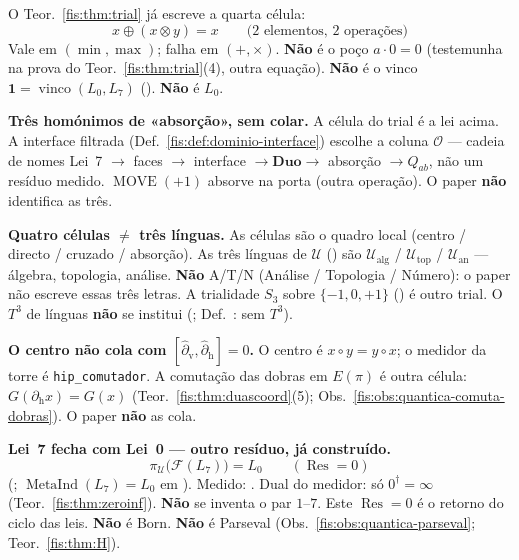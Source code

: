 \documentclass[livro.tex]{subfiles}
\begin{document}
\begin{observacao}\label{fis:obs:quantica-absorcao-lei7}
O Teor.~\ref{fis:thm:trial} já escreve a quarta célula:
\[
\boxed{\;
x\oplus(x\otimes y)=x
\qquad
\text{(2 elementos, 2 operações)}
\;}
\]
Vale em \((\min,\max)\); falha em \((+,\times)\).
\textbf{Não} é o poço \(a\cdot 0=0\)
(testemunha na prova do Teor.~\ref{fis:thm:trial}(4),
outra equação).
\textbf{Não} é o vinco
\(\mathbf{1}=\operatorname{vinco}(L_0,L_7)\)
().
\textbf{Não} é \(L_0\).

\medskip\noindent\textbf{Três homónimos de «absorção», sem colar.}
A célula do trial é a lei acima.
A interface filtrada
(Def.~\ref{fis:def:dominio-interface})
escolhe a coluna \(\mathcal{O}\) ---
cadeia de nomes
Lei~7 \(\to\) faces \(\to\) interface
\(\to\mathbf{Duo}\to\) absorção \(\to Q_{ab}\),
não um resíduo medido.
\(\operatorname{MOVE}(+1)\) absorve na porta
(outra operação).
O paper \textbf{não} identifica as três.

\medskip\noindent\textbf{Quatro células \(\neq\) três línguas.}
As células são o quadro local
(centro / directo / cruzado / absorção).
As três línguas de \(\mathcal{U}\)
()
são
\(\mathcal{U}_{\mathrm{alg}}\) /
\(\mathcal{U}_{\mathrm{top}}\) /
\(\mathcal{U}_{\mathrm{an}}\)
--- álgebra, topologia, análise.
\textbf{Não} A/T/N
(Análise / Topologia / Número):
o paper não escreve essas três letras.
A trialidade \(S_{3}\) sobre
\(\{-1,0,+1\}\)
()
é outro trial.
O \(T^{3}\) de línguas
\textbf{não} se institui
(;
Def.~:
sem \(T^{3}\)).

\medskip\noindent\textbf{O centro não cola com
\([\hat\partial_{\mathrm{v}},\hat\partial_{\mathrm{h}}]=0\).}
O centro é
\(x\circ y=y\circ x\);
o medidor da torre é
\texttt{hip\_comutador}.
A comutação das dobras em \(E(\pi)\)
é outra célula:
\(G(\partial_{\mathrm{h}}x)=G(x)\)
(Teor.~\ref{fis:thm:duascoord}(5);
Obs.~\ref{fis:obs:quantica-comuta-dobras}).
O paper \textbf{não} as cola.

\medskip\noindent\textbf{Lei~7 fecha com Lei~0 --- outro
resíduo, já construído.}
\[
\boxed{\;
\pi_{\mathcal{U}}\bigl(\mathcal{F}(L_7)\bigr)=L_0
\qquad
(\operatorname{Res}=0)
\;}
\]
(;
\(\operatorname{MetaInd}(L_7)=L_0\)
em ).
Medido:
.
Dual do medidor: só
\(0^{\dagger}=\infty\)
(Teor.~\ref{fis:thm:zeroinf}).
\textbf{Não} se inventa o par \(1\)--\(7\).
Este \(\operatorname{Res}=0\) é o retorno
do ciclo das leis.
\textbf{Não} é Born.
\textbf{Não} é Parseval
(Obs.~\ref{fis:obs:quantica-parseval};
Teor.~\ref{fis:thm:H}).


\end{observacao}
\end{document}
